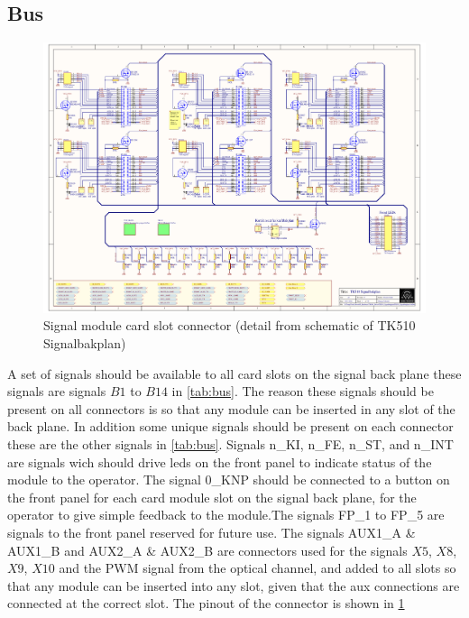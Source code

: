 \subsection{Bus}
\label{bus}
\begin{figure}[h]
    \centering
    \includegraphics[trim={4.1cm 14.3cm 21.2cm 3.3cm},clip,width=\textwidth]{img/TK510_Signalbakplan.pdf}
    \caption{Signal module card slot connector (detail from schematic of TK510 Signalbakplan)}
    \label{fig:signalmodulslot}
\end{figure}
A set of signals should be available to all card slots on the signal back plane these signals are signals $B1$ to $B14$ in \cref{tab:bus}. The reason these signals should be present on all connectors is so that any module can be inserted in any slot of the back plane. In addition some unique signals should be present on each connector these are the other signals in \cref{tab:bus}. Signals n\_KI, n\_FE, n\_ST, and n\_INT are signals wich should drive leds on the front panel to indicate status of the module to the operator. The signal 0\_KNP should be connected to a button on the front panel for each card module slot on the signal back plane, for the operator to give simple feedback to the module.The signals FP\_1 to FP\_5 are signals to the front panel reserved for future use. The signals AUX1\_A \& AUX1\_B and AUX2\_A \& AUX2\_B are connectors used for the signals $X5$, $X8$, $X9$, $X10$ and the PWM signal from the optical channel, and added to all slots so that any module can be inserted into any slot, given that the aux connections are connected at the correct slot. The pinout of the connector is shown in \cref{fig:signalmodulslot}
